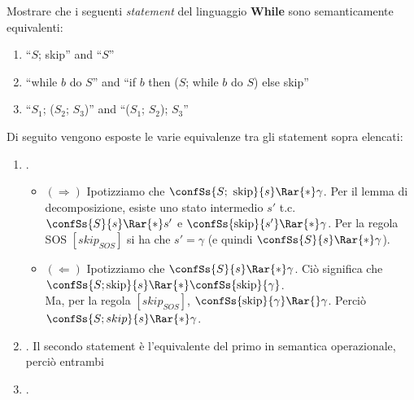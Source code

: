 {
  Mostrare che i seguenti \textit{statement} del linguaggio \textbf{While} sono
  semanticamente equivalenti:
  \begin{enumerate}[label=\alph*)]
    \item ``$S$; skip'' and ``$S$''
    \item ``while $b$ do $S$'' and
      ``if $b$ then ($S$; while $b$ do $S$) else skip''
    \item ``$S_1$; ($S_2$; $S_3$)'' and ``($S_1$; $S_2$); $S_3$''
  \end{enumerate}
}
{
  Di seguito vengono esposte le varie equivalenze tra gli statement sopra
  elencati:

  \begin{enumerate}[label=\alph*)]
    \item {}.

    \begin{itemize}
      \item $(\Rightarrow)$ Ipotizziamo che
      $\confSs{S;\mbox{ skip}}{s} \Rar{*} \gamma$. Per il lemma di
      decomposizione, esiste uno stato intermedio $s'$ t.c.
      $\confSs{S}{s} \Rar{*} s'$ e $\confSs{\mbox{skip}}{s'} \Rar{*} \gamma$.
      Per la regola SOS $[skip_{SOS}]$ si ha che $s' = \gamma$ (e quindi
      $\confSs{S}{s} \Rar{*} \gamma$).

      \item $(\Leftarrow)$ Ipotizziamo che $\confSs{S}{s} \Rar{*} \gamma$. Ciò
      significa che
      $\confSs{S; \mbox{skip}}{s} \Rar{*} \confSs{\mbox{skip}}{\gamma}$. \\
      Ma, per la regola $[skip_{SOS}]$,
      $\confSs{\mbox{skip}}{\gamma} \Rar{} \gamma$. Perciò
      $\confSs{S; skip}{s} \Rar{*} \gamma$.
    \end{itemize}


    \item {}. 
      Il secondo statement è
      l'equivalente del primo in semantica operazionale, perciò entrambi

    \item {}.
  \end{enumerate}
}
